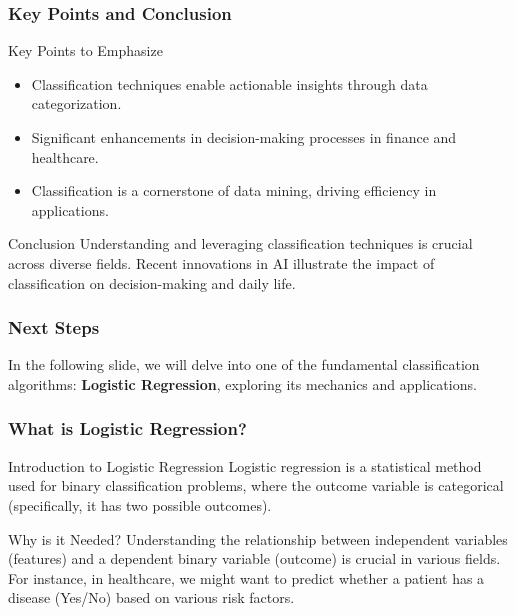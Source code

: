 \documentclass[aspectratio=169]{beamer}
\begin{document}
\begin{frame}[fragile]
    \frametitle{Key Points and Conclusion}
    \begin{block}{Key Points to Emphasize}
        \begin{itemize}
            \item Classification techniques enable actionable insights through data categorization.
            \item Significant enhancements in decision-making processes in finance and healthcare.
            \item Classification is a cornerstone of data mining, driving efficiency in applications.
        \end{itemize}
    \end{block}
    
    \begin{block}{Conclusion}
        Understanding and leveraging classification techniques is crucial across diverse fields. Recent innovations in AI illustrate the impact of classification on decision-making and daily life.
    \end{block}
\end{frame}

\begin{frame}[fragile]
    \frametitle{Next Steps}
    In the following slide, we will delve into one of the fundamental classification algorithms: \textbf{Logistic Regression}, exploring its mechanics and applications.
\end{frame}

\begin{frame}[fragile]
    \frametitle{What is Logistic Regression?}
    \begin{block}{Introduction to Logistic Regression}
        Logistic regression is a statistical method used for binary classification problems, where the outcome variable is categorical (specifically, it has two possible outcomes).
    \end{block}
    
    \begin{block}{Why is it Needed?}
        Understanding the relationship between independent variables (features) and a dependent binary variable (outcome) is crucial in various fields. For instance, in healthcare, we might want to predict whether a patient has a disease (Yes/No) based on various risk factors.
    \end{block}
\end{frame}
\end{document}
